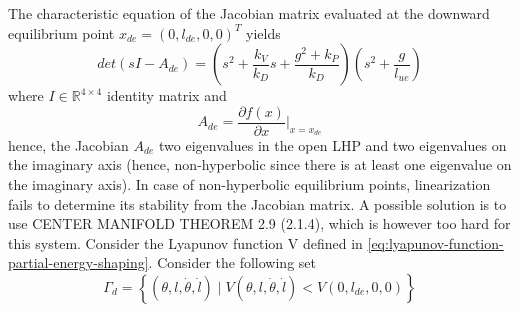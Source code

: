 \documentclass[main.tex]{subfiles}
\begin{document}
The characteristic equation of the Jacobian matrix evaluated
at the downward equilibrium point $x_{de} = (0, l_{de}, 0, 0)^T$ yields
\begin{equation}
  det(sI-A_{de}) = \left( s^2 + \frac{k_V}{k_D}s +
    \frac{g^2+k_P}{k_D} \right) \left( s^2 + \frac{g}{l_{ue}}
    \right)
\end{equation}
where $I \in \mathbb{R}^{4 \times 4}$ identity matrix and
\begin{equation}
  A_{de} = \frac{\partial f(x)}{\partial x} \bigg\rvert_{x=x_{de}}
\end{equation}
hence, the Jacobian $A_{de}$ two eigenvalues in the open LHP and two
eigenvalues on the imaginary axis (hence, non-hyperbolic since there
is at least one eigenvalue on the imaginary axis). In case of
non-hyperbolic equilibrium points, linearization fails to determine
its stability from the Jacobian matrix. A possible solution
is to use CENTER MANIFOLD THEOREM 2.9 (2.1.4), which is 
however too hard for this system. Consider the Lyapunov
function V defined in
\eqref{eq:lyapunov-function-partial-energy-shaping}.
Consider the following set
\begin{equation}
  \label{eq:Gamma-d-invariant-set}
  \Gamma_d = \left\{ (\theta, l, \dot{\theta}, \dot{l})
    \mid V(\theta, l, \dot{\theta}, \dot{l}) <
    V(0, l_{de}, 0, 0) \right\}
\end{equation}
\end{document}
